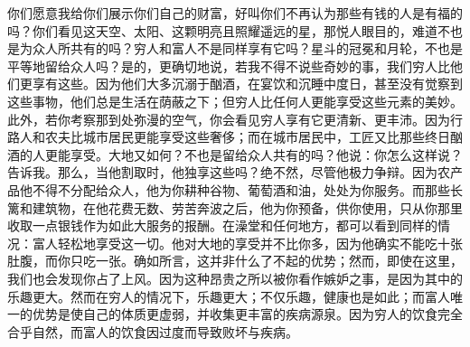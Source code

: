 你们愿意我给你们展示你们自己的财富，好叫你们不再认为那些有钱的人是有福的吗？你们看见这天空、太阳、这颗明亮且照耀遥远的星，那悦人眼目的，难道不也是为众人所共有的吗？穷人和富人不是同样享有它吗？星斗的冠冕和月轮，不也是平等地留给众人吗？是的，更确切地说，若我不得不说些奇妙的事，我们穷人比他们更享有这些。因为他们大多沉溺于酗酒，在宴饮和沉睡中度日，甚至没有觉察到这些事物，他们总是生活在荫蔽之下；但穷人比任何人更能享受这些元素的美妙。此外，若你考察那到处弥漫的空气，你会看见穷人享有它更清新、更丰沛。因为行路人和农夫比城市居民更能享受这些奢侈；而在城市居民中，工匠又比那些终日酗酒的人更能享受。大地又如何？不也是留给众人共有的吗？他说：你怎么这样说？告诉我。那么，当他割取时，他独享这些吗？绝不然，尽管他极力争辩。因为农产品他不得不分配给众人，他为你耕种谷物、葡萄酒和油，处处为你服务。而那些长篱和建筑物，在他花费无数、劳苦奔波之后，他为你预备，供你使用，只从你那里收取一点银钱作为如此大服务的报酬。在澡堂和任何地方，都可以看到同样的情况：富人轻松地享受这一切。他对大地的享受并不比你多，因为他确实不能吃十张肚腹，而你只吃一张。确如所言，这并非什么了不起的优势；然而，即使在这里，我们也会发现你占了上风。因为这种昂贵之所以被你看作嫉妒之事，是因为其中的乐趣更大。然而在穷人的情况下，乐趣更大；不仅乐趣，健康也是如此；而富人唯一的优势是使自己的体质更虚弱，并收集更丰富的疾病源泉。因为穷人的饮食完全合乎自然，而富人的饮食因过度而导致败坏与疾病。\par

